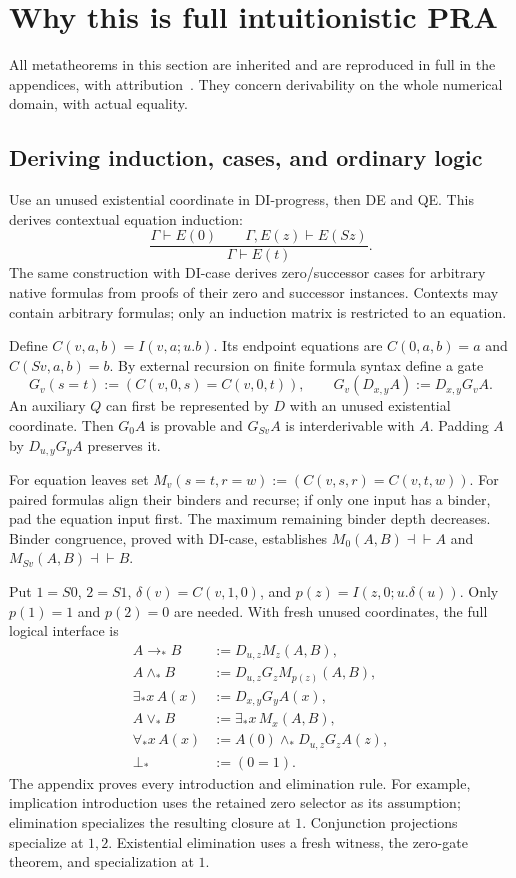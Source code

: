 \section{Why this is full intuitionistic PRA}
\label{sec:ipra-equivalence}

All metatheorems in this section are inherited and are reproduced in full
in the appendices, with attribution~\cite{choice,flat}. They concern
derivability on the whole numerical domain, with actual equality.

\subsection{Deriving induction, cases, and ordinary logic}

Use an unused existential coordinate in DI-progress, then DE and QE.
This derives contextual equation induction:
\[
 \frac{\Gamma\vdash E(0)\qquad\Gamma,E(z)\vdash E(Sz)}
      {\Gamma\vdash E(t)}.
\]
The same construction with DI-case derives zero/successor cases for
arbitrary native formulas from proofs of their zero and successor
instances. Contexts may contain arbitrary formulas; only an induction
matrix is restricted to an equation.

Define $C(v,a,b)=I(v,a;u.b)$. Its endpoint equations are
$C(0,a,b)=a$ and $C(Sv,a,b)=b$. By external recursion on finite formula
syntax define a gate
\[
 G_v(s=t):=(C(v,0,s)=C(v,0,t)),\qquad
 G_v(D_{x,y}A):=D_{x,y}G_vA.
\]
An auxiliary $Q$ can first be represented by $D$ with an unused existential
coordinate. Then $G_0A$ is provable and $G_{Sv}A$ is interderivable with
$A$. Padding $A$ by $D_{u,y}G_yA$ preserves it.

For equation leaves set
$M_v(s=t,r=w):=(C(v,s,r)=C(v,t,w))$.
For paired formulas align their binders and recurse; if only one input
has a binder, pad the equation input first. The maximum remaining binder
depth decreases. Binder congruence, proved with DI-case, establishes
$M_0(A,B)\dashv\vdash A$ and $M_{Sv}(A,B)\dashv\vdash B$.

Put $1=S0$, $2=S1$, $\delta(v)=C(v,1,0)$, and
$p(z)=I(z,0;u.\delta(u))$. Only $p(1)=1$ and $p(2)=0$ are needed.
With fresh unused coordinates, the full logical interface is
\begin{align*}
 A\to_*B&:=D_{u,z}M_z(A,B),\\
 A\wedge_*B&:=D_{u,z}G_zM_{p(z)}(A,B),\\
 \exists_*x\,A(x)&:=D_{x,y}G_yA(x),\\
 A\vee_*B&:=\exists_*x\,M_x(A,B),\\
 \forall_*x\,A(x)&:=A(0)\wedge_*D_{u,z}G_zA(z),\\
 \bot_*&:=(0=1).
\end{align*}
The appendix proves every introduction and elimination rule. For example,
implication introduction uses the retained zero selector as its assumption;
elimination specializes the resulting closure at $1$. Conjunction
projections specialize at $1,2$. Existential elimination uses a fresh
witness, the zero-gate theorem, and specialization at $1$.

